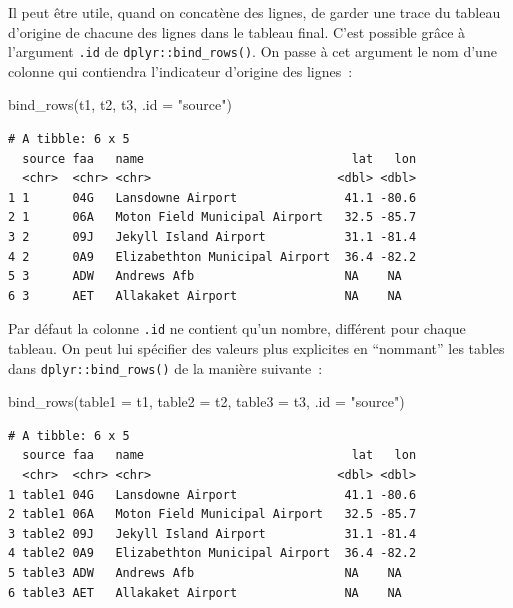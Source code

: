 \documentclass[
  letterpaper,
  DIV=11,
  numbers=noendperiod,
  oneside]{scrreprt}
\newenvironment{Shaded}{\begin{snugshade}}{\end{snugshade}}
\newcommand{\AttributeTok}[1]{\textcolor[rgb]{0.40,0.45,0.13}{#1}}
\newcommand{\FunctionTok}[1]{\textcolor[rgb]{0.28,0.35,0.67}{#1}}
\newcommand{\NormalTok}[1]{\textcolor[rgb]{0.00,0.23,0.31}{#1}}
\newcommand{\StringTok}[1]{\textcolor[rgb]{0.13,0.47,0.30}{#1}}
\begin{document}
Il peut être utile, quand on concatène des lignes, de garder une trace
du tableau d'origine de chacune des lignes dans le tableau final. C'est
possible grâce à l'argument \texttt{.id} de
\texttt{dplyr::bind\_rows()}. On passe à cet argument le nom d'une
colonne qui contiendra l'indicateur d'origine des lignes~:

\begin{Shaded}
\begin{Highlighting}[]
\FunctionTok{bind\_rows}\NormalTok{(t1, t2, t3, }\AttributeTok{.id =} \StringTok{"source"}\NormalTok{)}
\end{Highlighting}
\end{Shaded}

\begin{verbatim}
# A tibble: 6 x 5
  source faa   name                             lat   lon
  <chr>  <chr> <chr>                          <dbl> <dbl>
1 1      04G   Lansdowne Airport               41.1 -80.6
2 1      06A   Moton Field Municipal Airport   32.5 -85.7
3 2      09J   Jekyll Island Airport           31.1 -81.4
4 2      0A9   Elizabethton Municipal Airport  36.4 -82.2
5 3      ADW   Andrews Afb                     NA    NA  
6 3      AET   Allakaket Airport               NA    NA  
\end{verbatim}

Par défaut la colonne \texttt{.id} ne contient qu'un nombre, différent
pour chaque tableau. On peut lui spécifier des valeurs plus explicites
en ``nommant'' les tables dans \texttt{dplyr::bind\_rows()} de la
manière suivante~:

\begin{Shaded}
\begin{Highlighting}[]
\FunctionTok{bind\_rows}\NormalTok{(}\AttributeTok{table1 =}\NormalTok{ t1, }\AttributeTok{table2 =}\NormalTok{ t2, }\AttributeTok{table3 =}\NormalTok{ t3, }\AttributeTok{.id =} \StringTok{"source"}\NormalTok{)}
\end{Highlighting}
\end{Shaded}

\begin{verbatim}
# A tibble: 6 x 5
  source faa   name                             lat   lon
  <chr>  <chr> <chr>                          <dbl> <dbl>
1 table1 04G   Lansdowne Airport               41.1 -80.6
2 table1 06A   Moton Field Municipal Airport   32.5 -85.7
3 table2 09J   Jekyll Island Airport           31.1 -81.4
4 table2 0A9   Elizabethton Municipal Airport  36.4 -82.2
5 table3 ADW   Andrews Afb                     NA    NA  
6 table3 AET   Allakaket Airport               NA    NA  
\end{verbatim}
\end{document}
